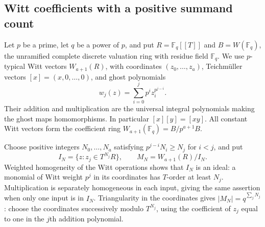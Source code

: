 \documentclass[11pt]{amsart}
\theoremstyle{definition}
\numberwithin{equation}{section}
\begin{document}
\subsection{Witt coefficients with a positive summand count}
\label{sec:higher-witt-coefficients}

Let $p$ be a prime, let $q$ be a power of $p$, and put
$R=\mathbb F_q[[T]]$ and $B=W(\mathbb F_q)$, the unramified complete
discrete valuation ring with residue field $\mathbb F_q$.
We use $p$-typical Witt vectors $W_{a+1}(R)$, with coordinates
$(z_0,\ldots,z_a)$, Teichm\"uller vectors $[x]=(x,0,\ldots,0)$,
and ghost polynomials
\[
 w_j(z)=\sum_{i=0}^j p^i z_i^{p^{j-i}}.
\]
Their addition and multiplication are the universal integral
polynomials making the ghost maps homomorphisms. In particular
$[x][y]=[xy]$. All constant Witt vectors form the coefficient ring
$W_{a+1}(\mathbb F_q)=B/p^{a+1}B$.

Choose positive integers $N_0,\ldots,N_a$ satisfying
$p^{j-i}N_i\ge N_j$ for $i<j$, and put
\[
 I_N=\{z:z_j\in T^{N_j}R\},\qquad
 M_N=W_{a+1}(R)/I_N.
\]
Weighted homogeneity of the Witt operations shows that $I_N$ is an
ideal: a monomial of Witt weight $p^j$ in its coordinates has
$T$-order at least $N_j$. Multiplication is separately homogeneous
in each input, giving the same assertion when only one input is in
$I_N$. Triangularity in the coordinates gives
$|M_N|=q^{\sum_jN_j}$: choose the coordinates successively modulo
$T^{N_j}$, using the coefficient of $z_j$ equal to one in the
$j$th addition polynomial.
\end{document}
